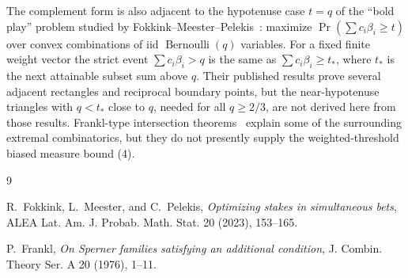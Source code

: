\documentclass[12pt]{article}
\newcommand{\Ber}{\operatorname{Bernoulli}}
\begin{document}
The complement form is also adjacent to the hypotenuse case \(t=q\) of the
``bold play'' problem studied by Fokkink--Meester--Pelekis~\cite{FMP}: maximize
\(\Pr(\sum c_i\beta_i\ge t)\) over convex combinations of iid
\(\Ber(q)\) variables.  For a fixed finite weight vector the strict event
\(\sum c_i\beta_i>q\) is the same as \(\sum c_i\beta_i\ge t_*\), where
\(t_*\) is the next attainable subset sum above \(q\).  Their published
results prove several adjacent rectangles and reciprocal boundary points, but
the near-hypotenuse triangles with \(q<t_*\) close to \(q\), needed for all
\(q\ge2/3\), are not derived here from those results.  Frankl-type
intersection theorems~\cite{Frankl} explain some of the surrounding extremal
combinatorics, but they do not presently supply the weighted-threshold biased
measure bound (4).

\begin{thebibliography}{9}

R.~Fokkink, L.~Meester, and C.~Pelekis,
\emph{Optimizing stakes in simultaneous bets},
ALEA Lat. Am. J. Probab. Math. Stat. 20 (2023), 153--165.

P.~Frankl,
\emph{On Sperner families satisfying an additional condition},
J. Combin. Theory Ser. A 20 (1976), 1--11.

\end{thebibliography}
\end{document}
